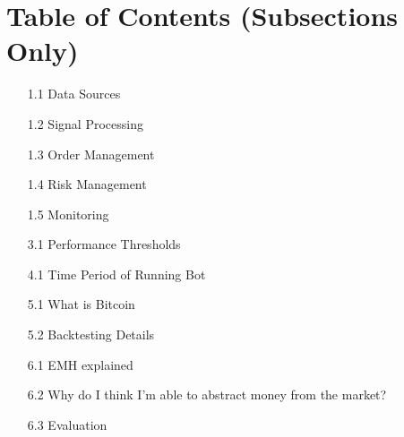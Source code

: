 \tableofcontents
\section*{Table of Contents (Subsections Only)}
\begin{enumerate}
  \item[1.1] Data Sources
  \item[1.2] Signal Processing
  \item[1.3] Order Management
  \item[1.4] Risk Management
  \item[1.5] Monitoring

  \item[3.1] Performance Thresholds

  \item[4.1] Time Period of Running Bot

  \item[5.1] What is Bitcoin
  \item[5.2] Backtesting Details

  \item[6.1] EMH explained
  \item[6.2] Why do I think I’m able to abstract money from the market?
  \item[6.3] Evaluation
\end{enumerate}
